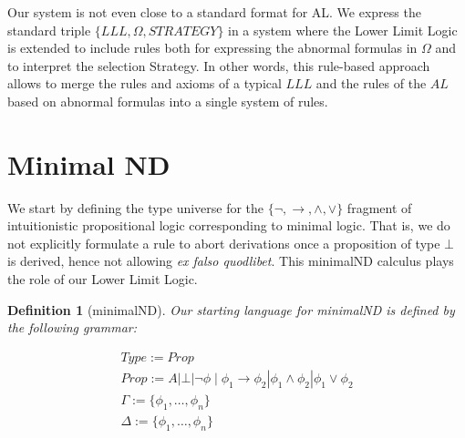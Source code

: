 \documentclass[]{article}
\newtheorem{definition}{Definition}
\begin{document}
Our system is not even close to a standard format for AL. We express the standard triple $\{LLL,\Omega,STRATEGY\}$ in a system where the Lower Limit Logic is extended to include rules both for expressing the abnormal formulas in $\Omega$ and to interpret the selection Strategy. In other words, this rule-based approach allows to merge the rules and axioms of a typical $LLL$ and the rules of the $AL$ based on abnormal formulas into a single system of rules. 



\section{Minimal ND}

We start by defining the type universe for the $\{\neg, \rightarrow, \wedge, \vee\}$ fragment of intuitionistic propositional logic corresponding to minimal logic. That is, we do not explicitly formulate a rule to abort derivations once a proposition of type $\bot$ is derived, hence not allowing \textit{ex falso quodlibet}. This {\sf minimalND} calculus plays the role of our Lower Limit Logic. 

\begin{definition}[{\sf minimalND}]

 Our starting language for {\sf minimalND} is defined by the following grammar:
 
\begin{displaymath}
\begin{array}{l}
Type:=Prop\\
Prop:= A | \bot | \neg \phi \mid \phi_{1} \rightarrow \phi_{2} | \phi_{1} \wedge \phi_{2} | \phi_{1} \vee \phi_{2}\\
\Gamma := \{\phi_{1}, \dots, \phi_{n}\}\\
\Delta := \{\phi_{1}, \dots, \phi_{n}\}

\end{array}
\end{displaymath}
\end{definition}
\end{document}
